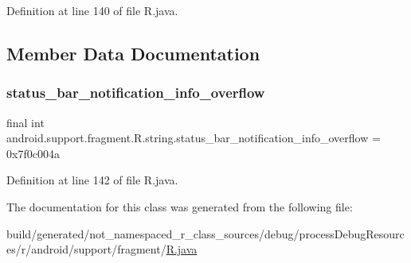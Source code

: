Definition at line 140 of file R.\+java.


\begin{DoxyCode}{0}

\end{DoxyCode}


\subsection{Member Data Documentation}
\mbox{\label{classandroid_1_1support_1_1fragment_1_1_r_1_1string_afe54f0256b7cd91c2b0175f6dd55f9cc}} 
\subsubsection{\texorpdfstring{status\_bar\_notification\_info\_overflow}{status\_bar\_notification\_info\_overflow}}
{\footnotesize\ttfamily final int android.\+support.\+fragment.\+R.\+string.\+status\+\_\+bar\+\_\+notification\+\_\+info\+\_\+overflow = 0x7f0c004a\hspace{0.3cm}{\ttfamily [static]}}



Definition at line 142 of file R.\+java.



The documentation for this class was generated from the following file\+:\begin{DoxyCompactItemize}
\item 
build/generated/not\+\_\+namespaced\+\_\+r\+\_\+class\+\_\+sources/debug/process\+Debug\+Resources/r/android/support/fragment/\mbox{\hyperlink{android_2support_2fragment_2_r_8java}{R.\+java}}\end{DoxyCompactItemize}
